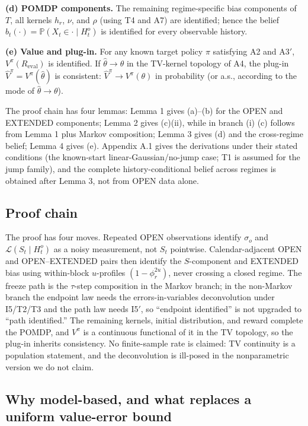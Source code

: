 \textbf{(d) POMDP components.} The remaining regime-specific bias components of $T$, all kernels $h_r$, $\nu$, and $\rho$ (using T4 and A7) are identified; hence the belief $b_t(\cdot)=\mathbb P(X_t\in\cdot\mid H_t^o)$ is identified for every observable history.

\textbf{(e) Value and plug-in.} For any known target policy $\pi$ satisfying A2 and A3$'$, $V^\pi(R_{\mathrm{eval}})$ is identified. If $\hat\theta\to\theta$ in the TV-kernel topology of A4, the plug-in $\hat V^\pi=V^\pi(\hat\theta)$ is consistent: $\hat V^\pi\to V^\pi(\theta)$ in probability (or a.s., according to the mode of $\hat\theta\to\theta$).

The proof chain has four lemmas: Lemma 1 gives (a)--(b) for the OPEN and EXTENDED components; Lemma 2 gives (c)(ii), while in branch (i) (c) follows from Lemma 1 plus Markov composition; Lemma 3 gives (d) and the cross-regime belief; Lemma 4 gives (e). Appendix A.1 gives the derivations under their stated conditions (the known-start linear-Gaussian/no-jump case; T1 is assumed for the jump family), and the complete history-conditional belief across regimes is obtained after Lemma 3, not from OPEN data alone.

\subsection{Proof chain}

The proof has four moves. Repeated OPEN observations identify $\sigma_o$ and $\mathcal L(S_t\mid H_t^o)$ as a noisy measurement, not $S_t$ pointwise. Calendar-adjacent OPEN and OPEN--EXTENDED pairs then identify the $S$-component and EXTENDED bias using within-block $u$-profiles $(1-\phi_r^{2u})$, never crossing a closed regime. The freeze path is the $\tau$-step composition in the Markov branch; in the non-Markov branch the endpoint law needs the errors-in-variables deconvolution under I5/T2/T3 and the path law needs I5$'$, so ``endpoint identified'' is not upgraded to ``path identified.'' The remaining kernels, initial distribution, and reward complete the POMDP, and $V^\pi$ is a continuous functional of it in the TV topology, so the plug-in inherits consistency. No finite-sample rate is claimed: TV continuity is a population statement, and the deconvolution is ill-posed in the nonparametric version we do not claim.

\subsection{Why model-based, and what replaces a uniform value-error bound}

